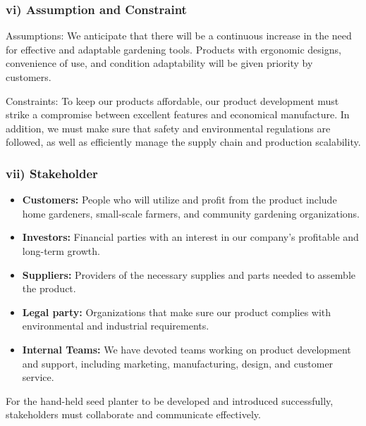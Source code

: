 \subsubsection*{vi) Assumption and Constraint}
Assumptions: We anticipate that there will be a continuous increase in the need for effective and adaptable gardening tools. Products with ergonomic designs, convenience of use, and condition adaptability will be given priority by customers.

Constraints: To keep our products affordable, our product development must strike a compromise between excellent features and economical manufacture. In addition, we must make sure that safety and environmental regulations are followed, as well as efficiently manage the supply chain and production scalability.
\subsubsection*{vii) Stakeholder}
\begin{itemize}
    \item \textbf{Customers:} People who will utilize and profit from the product include home gardeners, small-scale farmers, and community gardening organizations.
    \item \textbf{Investors:} Financial parties with an interest in our company's profitable and long-term growth.
    \item \textbf{Suppliers:} Providers of the necessary supplies and parts needed to assemble the product.
    \item \textbf{Legal party:} Organizations that make sure our product complies with environmental and industrial requirements.
    \item \textbf{Internal Teams:} We have devoted teams working on product development and support, including marketing, manufacturing, design, and customer service.
\end{itemize}
For the hand-held seed planter to be developed and introduced successfully, stakeholders must collaborate and communicate effectively.
